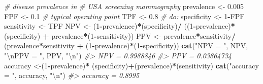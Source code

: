 \documentclass[
]{book}
\newenvironment{Shaded}{\begin{snugshade}}{\end{snugshade}}
\newcommand{\CharTok}[1]{\textcolor[rgb]{0.31,0.60,0.02}{#1}}
\newcommand{\CommentTok}[1]{\textcolor[rgb]{0.56,0.35,0.01}{\textit{#1}}}
\newcommand{\DecValTok}[1]{\textcolor[rgb]{0.00,0.00,0.81}{#1}}
\newcommand{\FloatTok}[1]{\textcolor[rgb]{0.00,0.00,0.81}{#1}}
\newcommand{\KeywordTok}[1]{\textcolor[rgb]{0.13,0.29,0.53}{\textbf{#1}}}
\newcommand{\NormalTok}[1]{#1}
\newcommand{\OperatorTok}[1]{\textcolor[rgb]{0.81,0.36,0.00}{\textbf{#1}}}
\newcommand{\StringTok}[1]{\textcolor[rgb]{0.31,0.60,0.02}{#1}}
\begin{document}
\begin{Shaded}
\begin{Highlighting}[]
\CommentTok{\# disease prevalence in }
\CommentTok{\# USA screening mammography}
\NormalTok{prevalence \textless{}{-}}\StringTok{ }\FloatTok{0.005}
\NormalTok{FPF \textless{}{-}}\StringTok{ }\FloatTok{0.1} \CommentTok{\# typical operating point}
\NormalTok{TPF \textless{}{-}}\StringTok{ }\FloatTok{0.8} \CommentTok{\#        do:}
\NormalTok{specificity \textless{}{-}}\StringTok{ }\DecValTok{1}\OperatorTok{{-}}\NormalTok{FPF}
\NormalTok{sensitivity \textless{}{-}}\StringTok{ }\NormalTok{TPF}
\NormalTok{NPV \textless{}{-}}\StringTok{ }\NormalTok{(}\DecValTok{1}\OperatorTok{{-}}\NormalTok{prevalence)}\OperatorTok{*}\NormalTok{(specificity)}\OperatorTok{/}
\StringTok{  }\NormalTok{((}\DecValTok{1}\OperatorTok{{-}}\NormalTok{prevalence)}\OperatorTok{*}\NormalTok{(specificity) }\OperatorTok{+}\StringTok{ }
\StringTok{     }\NormalTok{prevalence}\OperatorTok{*}\NormalTok{(}\DecValTok{1}\OperatorTok{{-}}\NormalTok{sensitivity))}
\NormalTok{PPV \textless{}{-}}\StringTok{ }\NormalTok{prevalence}\OperatorTok{*}\NormalTok{sensitivity}\OperatorTok{/}
\StringTok{  }\NormalTok{(prevalence}\OperatorTok{*}\NormalTok{sensitivity }\OperatorTok{+}\StringTok{ }
\StringTok{     }\NormalTok{(}\DecValTok{1}\OperatorTok{{-}}\NormalTok{prevalence)}\OperatorTok{*}\NormalTok{(}\DecValTok{1}\OperatorTok{{-}}\NormalTok{specificity))}
\KeywordTok{cat}\NormalTok{(}\StringTok{"NPV = "}\NormalTok{, NPV, }\StringTok{"}\CharTok{\textbackslash{}n}\StringTok{PPV = "}\NormalTok{, PPV, }\StringTok{"}\CharTok{\textbackslash{}n}\StringTok{"}\NormalTok{)}
\CommentTok{\#\textgreater{} NPV =  0.9988846 }
\CommentTok{\#\textgreater{} PPV =  0.03864734}
\NormalTok{accuracy \textless{}{-}(}\DecValTok{1}\OperatorTok{{-}}\NormalTok{prevalence)}\OperatorTok{*}
\StringTok{  }\NormalTok{(specificity)}\OperatorTok{+}\NormalTok{(prevalence)}\OperatorTok{*}\NormalTok{(sensitivity)}
\KeywordTok{cat}\NormalTok{(}\StringTok{"accuracy = "}\NormalTok{, accuracy, }\StringTok{"}\CharTok{\textbackslash{}n}\StringTok{"}\NormalTok{)}
\CommentTok{\#\textgreater{} accuracy =  0.8995}
\end{Highlighting}
\end{Shaded}
\end{document}
